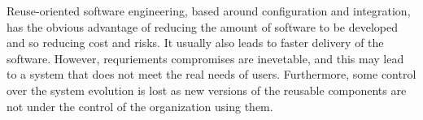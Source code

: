 Reuse-oriented software engineering, based around configuration and integration, has the obvious advantage of reducing the amount of software to be developed and so reducing cost and risks. It usually also leads to faster delivery of the software. However, requriements compromises are inevetable, and this may lead to a system that does not meet the real needs of users. Furthermore, some control over the system evolution is lost as new versions of the reusable components are not under the control of the organization using them.